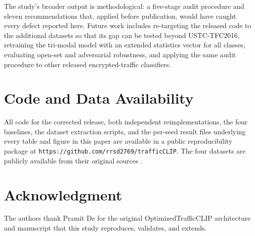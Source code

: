 \documentclass[journal]{IEEEtran}
\begin{document}
The study's broader output is methodological: a five-stage audit procedure and eleven recommendations that, applied before publication, would have caught every defect reported here. Future work includes re-targeting the released code to the additional datasets so that its gap can be tested beyond USTC-TFC2016, retraining the tri-modal model with an extended statistics vector for all classes, evaluating open-set and adversarial robustness, and applying the same audit procedure to other released encrypted-traffic classifiers.

\section*{Code and Data Availability}
All code for the corrected release, both independent reimplementations, the four baselines, the dataset extraction scripts, and the per-seed result files underlying every table and figure in this paper are available in a public reproducibility package at \texttt{https://github.com/rrsd2769/traf{}ficCLIP}. The four datasets are publicly available from their original sources \cite{ustc,iscxvpn,g5traffic,iot23}.

\section*{Acknowledgment}

The authors thank Pramit De for the original OptimizedTrafficCLIP architecture and manuscript that this study reproduces, validates, and extends.
\end{document}

